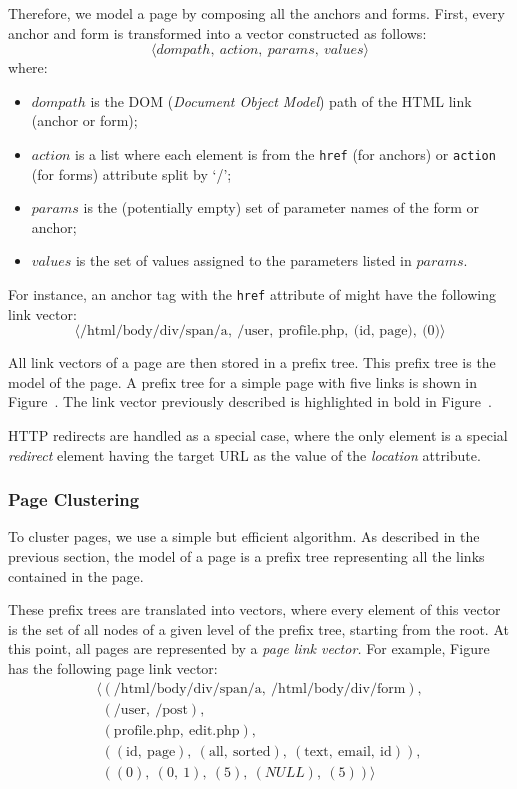 Therefore, we model a page by composing all the anchors and forms. First, every
anchor and form is transformed into a vector constructed as follows:
\[
\langle{}dompath,\ action,\ params,\ values\rangle{}
\]
where:
\begin{itemize}
 \item $dompath$ is the DOM (\emph{Document Object Model}) path of the HTML
  link (anchor or form);
 \item $action$ is a list where each element is from the \texttt{href} (for anchors) or
  \texttt{action} (for forms) attribute split by `/';
 \item $params$ is the (potentially empty) set of parameter names of the form
   or anchor;
 \item $values$ is the set of values assigned to the parameters listed in
   $params$.
\end{itemize}

\noindent{}For instance, an anchor tag with the \texttt{href} attribute of
 might have the following link vector:%
\[\langle{}\text{/html/body/div/span/a},\ \text{/user},\ \text{profile.php},\ \text{(id,
  page)},\ \text{(0)}\rangle{}\] 

All link vectors of a page are then stored in a prefix tree. This prefix tree
is the model of the page. A prefix tree for a simple page with five links is
shown in Figure~. The link vector previously described is
highlighted in bold in Figure~.

HTTP redirects are handled as a special case, where the only element is a
special \emph{redirect} element having the target URL as the value of the
\emph{location} attribute.

\subsubsection{Page Clustering}

To cluster pages, we use a simple but efficient algorithm. As described in the
previous section, the model of a page is a prefix tree representing all the links
contained in the page.

These prefix trees are translated into vectors, where every element of this
vector is the set of all nodes of a given level of the prefix tree, starting
from the root. At this point, all pages are represented by a \emph{page link
  vector.} For example, Figure~ has the following page
link vector:
\[
\begin{array}{l}
\langle{}(\text{/html/body/div/span/a},\ \text{/html/body/div/form}), \\
\phantom{\langle{}}(\text{/user},\ \text{/post}), \\
\phantom{\langle{}}(\text{profile.php},\ \text{edit.php}), \\
\phantom{\langle{}}((\text{id},\ \text{page}),\ (\text{all},\ \text{sorted}),\ (\text{text},\ \text{email},\ \text{id})), \\
\phantom{\langle{}}((0),\ (0,\ 1),\ (5),\ (NULL),\ (5))\rangle{} \\
\end{array}
\]

